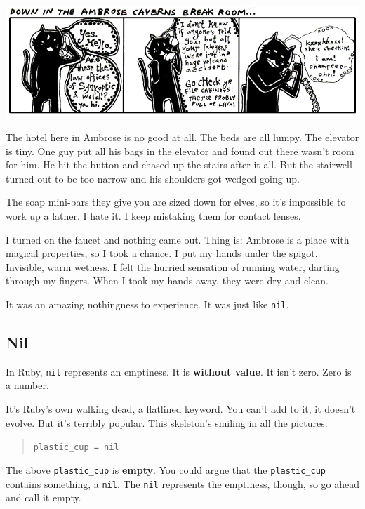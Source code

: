 \documentclass[10pt,twoside]{report}
\begin{document}
	\includegraphics[width=1.0\textwidth]{cache/27.png}

The hotel here in Ambrose is no good at all.  The beds are all
lumpy. The elevator is tiny.  One guy put all his bags in the elevator
and found out there wasn't room for him.  He hit the button and chased
up the stairs after it all.  But the stairwell turned out to be too
narrow and his shoulders got wedged going up.

The soap mini-bars they give you are sized down for elves, so it's
impossible to work up a lather.  I hate it.  I keep mistaking them for
contact lenses.

I turned on the faucet and nothing came out.  Thing is: Ambrose is a
place with magical properties, so I took a chance.  I put my hands
under the spigot.  Invisible, warm wetness.  I felt the hurried
sensation of running water, darting through my fingers.  When I took
my hands away, they were dry and clean.

It was an amazing nothingness to experience.  It was just like
\lstinline[breaklines=true]|nil|.



\subsection{Nil}



In Ruby, \lstinline[breaklines=true]|nil| represents an emptiness.  It
is {\bf without value}.  It isn't zero. Zero is a number.

It's Ruby's own walking dead, a flatlined keyword.  You can't add to
it, it doesn't evolve.  But it's terribly popular.  This skeleton's
smiling in all the pictures.

\begin{quote}
\lstinline[breaklines=true]|plastic_cup = nil|\end{quote}


The above \lstinline[breaklines=true]|plastic_cup| is {\bf empty}.
You could argue that the \lstinline[breaklines=true]|plastic_cup|
contains something, a \lstinline[breaklines=true]|nil|.  The
\lstinline[breaklines=true]|nil| represents the emptiness, though, so
go ahead and call it empty.
\end{document}
